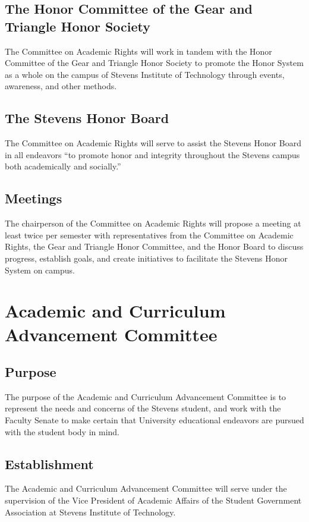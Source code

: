 \documentclass[12pt]{scrreprt}
\begin{document}
\subsection{The Honor Committee of the Gear and Triangle Honor Society}
The Committee on Academic Rights will work in tandem with the Honor Committee of
the Gear and Triangle Honor Society to promote the Honor System as a whole on the
campus of Stevens Institute of Technology through events, awareness, and other
methods. 

\subsection{The Stevens Honor Board}
The Committee on Academic Rights will serve to assist the Stevens Honor Board in all
endeavors “to promote honor and integrity throughout the Stevens campus both
academically and socially.”

\subsection{Meetings}
The chairperson of the Committee on Academic Rights will propose a meeting at least
twice per semester with representatives from the Committee on Academic Rights, the
Gear and Triangle Honor Committee, and the Honor Board to discuss progress, establish
goals, and create initiatives to facilitate the Stevens Honor System on campus. 

\section{Academic and Curriculum Advancement Committee}

\subsection{Purpose}
The purpose of the Academic and Curriculum Advancement Committee is to represent
the needs and concerns of the Stevens student, and work with the Faculty Senate to
make certain that University educational endeavors are pursued with the student body
in mind.

\subsection{Establishment}
The Academic and Curriculum Advancement Committee will serve under the supervision
of the Vice President of Academic Affairs of the Student Government Association at
Stevens Institute of Technology. 
\end{document}
